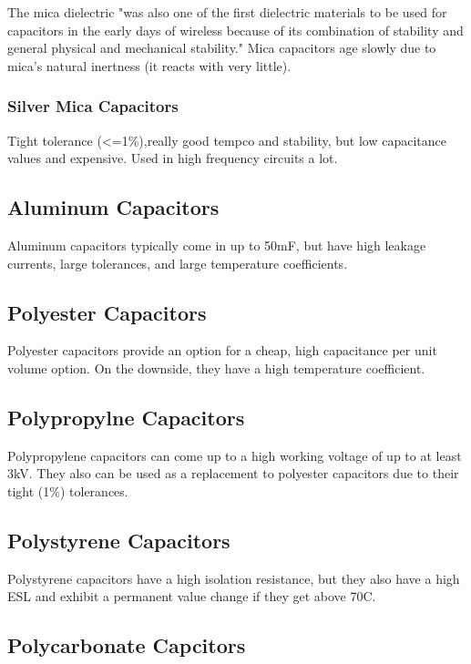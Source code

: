 The mica dielectric "was also one of the first dielectric materials to be used for capacitors in the early days of wireless because of its combination of stability and general physical and mechanical stability." Mica capacitors age slowly due to mica's natural inertness (it reacts with very little).\cite{radio_mica}

\subsubsection{Silver Mica Capacitors}

Tight tolerance (<=1\%),really good tempco and stability, but low capacitance values and expensive. Used in high frequency circuits a lot.\cite{learn_caps}

\subsection{Aluminum Capacitors}

Aluminum capacitors typically come in up to 50mF, but have high leakage currents, large tolerances, and large temperature coefficients. \cite{learn_caps}

\subsection{Polyester Capacitors}

Polyester capacitors provide an option for a cheap, high capacitance per unit volume option. On the downside, they have a high temperature coefficient. \cite{learn_caps}

\subsection{Polypropylne Capacitors}

Polypropylene capacitors can come up to a high working voltage of up to at least 3kV. They also can be used as a replacement to polyester capacitors due to their tight (1\%) tolerances.\cite{learn_caps}

\subsection{Polystyrene Capacitors}

Polystyrene capacitors have a high isolation resistance, but they also have a high ESL and exhibit a permanent value change if they get above 70C.
\cite{learn_caps}

\subsection{Polycarbonate Capcitors}

